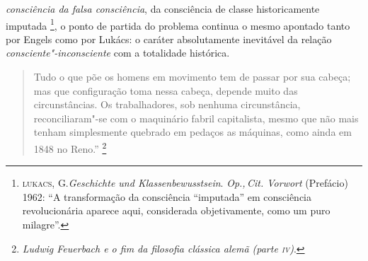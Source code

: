 \emph{consciência da falsa consciência}, da consciência de classe
historicamente imputada \footnote{\textsc{lukacs}, G.\emph{Geschichte und
  Klassenbewusstsein}. \emph{Op.,\,Cit. Vorwort} (Prefácio) 1962: ``A
  transformação da consciência ``imputada'' em consciência
  revolucionária aparece aqui, considerada objetivamente, como um puro
  milagre''.}, o ponto de partida do problema continua o mesmo apontado
tanto por Engels como por Lukács: o caráter absolutamente inevitável da
relação \emph{consciente"-inconsciente} com a totalidade histórica.

\begin{quote}
Tudo o que põe os homens em movimento tem de passar por sua cabeça; mas
que configuração toma nessa cabeça, depende muito das circunstâncias. Os
trabalhadores, sob nenhuma circunstância, reconciliaram"-se com o
maquinário fabril capitalista, mesmo que não mais tenham simplesmente
quebrado em pedaços as máquinas, como ainda em 1848 no Reno.''
\footnote{\emph{Ludwig Feuerbach e o fim da filosofia clássica alemã
  (parte \textsc{iv})}.}
\end{quote}

